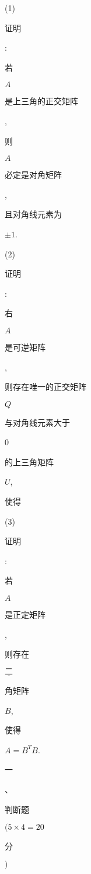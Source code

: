 \documentclass[10pt]{article}
\begin{document}
(1) \begin{CJK}{UTF8}{mj}证明\end{CJK}: \begin{CJK}{UTF8}{mj}若\end{CJK} $A$ \begin{CJK}{UTF8}{mj}是上三角的正交矩阵\end{CJK}, \begin{CJK}{UTF8}{mj}则\end{CJK} $A$ \begin{CJK}{UTF8}{mj}必定是对角矩阵\end{CJK}, \begin{CJK}{UTF8}{mj}且对角线元素为\end{CJK} $\pm 1$.

(2) \begin{CJK}{UTF8}{mj}证明\end{CJK}: \begin{CJK}{UTF8}{mj}右\end{CJK} $A$ \begin{CJK}{UTF8}{mj}是可逆矩阵\end{CJK}, \begin{CJK}{UTF8}{mj}则存在唯一的正交矩阵\end{CJK} $Q$ \begin{CJK}{UTF8}{mj}与对角线元素大于\end{CJK} 0 \begin{CJK}{UTF8}{mj}的上三角矩阵\end{CJK} $U$, \begin{CJK}{UTF8}{mj}使得\end{CJK}

(3) \begin{CJK}{UTF8}{mj}证明\end{CJK}: \begin{CJK}{UTF8}{mj}若\end{CJK} $A$ \begin{CJK}{UTF8}{mj}是正定矩阵\end{CJK}, \begin{CJK}{UTF8}{mj}则存在\end{CJK} $\underline{二}$ \begin{CJK}{UTF8}{mj}角矩阵\end{CJK} $B$, \begin{CJK}{UTF8}{mj}使得\end{CJK} $A=B^{T} B$. \begin{CJK}{UTF8}{mj}一\end{CJK}、\begin{CJK}{UTF8}{mj}判断题\end{CJK} $(5 \times 4=20$ \begin{CJK}{UTF8}{mj}分\end{CJK} $)$
\end{document}
